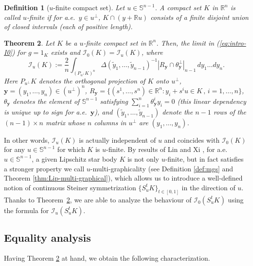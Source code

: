 \documentclass[11pt]{article}
\newtheorem{thm}{Theorem}[section]
\newtheorem{defn}[thm]{Definition}
\theoremstyle{definition}
\theoremstyle{proof}
\DeclareMathOperator{\+}{\mathop{\tilde{+}}}
\newcommand{\R}{\mathbb{R}}
\renewcommand{\S}{\mathbb{S}}
\newcommand{\I}{\mathcal{I}}
\newcommand{\y}{\mathbf{y}}
\numberwithin{equation}{section}
\numberwithin{equation}{section}
\begin{document}
\begin{defn}[$u$-finite compact set] \label{def:intro-u-finite}
Let $u \in \S^{n-1}$. 
A compact set $K$ in $\R^n$ is called $u$-finite if for a.e.~$y \in u^{\perp}$, $K \cap (y + \R u)$ consists of a finite disjoint union of closed intervals (each of positive length). 
\end{defn}


\begin{thm} \label{thm:intro-Iu}
Let $K$ be a $u$-finite compact set in $\R^n$. Then, the limit in (\ref{eq:intro-I0}) for $g = 1_K$ exists and $\I_0(K) = \I_u(K)$, where
\[
\I_u(K) := \frac{2}{n} \int_{(P_{u^\perp} K)^n} \Delta(\tilde y_1,\ldots,\tilde y_{n-1})^{-1} |R_\y \cap \theta_\y^{\perp}|_{n-1} \, dy_1 \ldots dy_n . 
\]
Here $P_{u^{\perp}} K$ denotes the orthogonal projection of $K$ onto $u^{\perp}$, $\y = (y_1,\ldots,y_n) \in (u^\perp)^n$, 
$R_\y = \{ (s^1,\ldots,s^n)  \in \R^n :  y_i + s^i u \in K \, , \, i=1,\ldots,n\}$, $\theta_\y$ denotes the element of $\S^{n-1}$ satisfying $\sum_{i=1}^n \theta_\y^i y_i = 0$ (this linear dependency is unique up to sign for a.e.~$\y$), and $(\tilde y_1,\ldots,\tilde y_{n-1})$ denote the $n-1$ rows of the $(n-1) \times n$ matrix whose $n$ columns in $u^{\perp}$ are $(y_1,\ldots,y_n)$. 
\end{thm}



In other words, $\I_u(K)$ is actually independent of $u$ and coincides with $\I_0(K)$ for any $u \in \S^{n-1}$ for which $K$ is $u$-finite. 
By results of Lin and Xi \cite{LinXi-LipschitzStarBodySymmetrization}, for a.e.~$u\in \S^{n-1}$, a given Lipschitz star body $K$ is not only $u$-finite, but in fact satisfies a stronger property we call $u$-multi-graphicality (see Definition \ref{def:mgs} and Theorem \ref{thm:Lip-multi-graphical}), which allows us to introduce a well-defined notion of continuous Steiner symmetrization $\{S_u^t K\}_{t \in [0,1]}$ in the direction of $u$. Thanks to Theorem~\ref{thm:intro-Iu}, we are able to analyze the behaviour of $\I_0(S_u^t K)$ using the formula for $\I_u(S_u^t K)$.




\subsection{Equality analysis}

Having Theorem \ref{thm:intro-Iu} at hand, we obtain the following characterization.   
\end{document}
